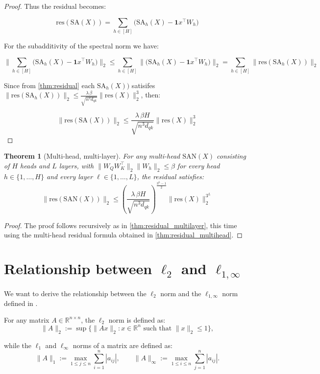 \documentclass{article}
\theoremstyle{definition}
\theoremstyle{plain}
\newtheorem{theorem}{Theorem}
\begin{document}
\begin{appendices}
\begin{proof}
Thus the residual becomes:

\[
\mathrm{res}(\mathrm{SA}(X)) = \sum_{h \in [H]} \bigl(\mathrm{SA}_h(X) - \mathbf{1}x^\top W_h\bigr)
\]

For the subadditivity of the spectral norm we have:

\[\|\sum_{h \in [H]} \bigl(\mathrm{SA}_h(X) - \mathbf{1}x^\top W_h\bigr)\|_2 \le  \sum_{h \in [H]} \|\bigl(\mathrm{SA}_h(X) - \mathbf{1}x^\top W_h\bigr)\|_2 = \sum_{h \in [H]} \|\mathrm{res}(\mathrm{SA}_h(X))\|_2\]

Since from \cref{thm:residual} each $\mathrm{SA}_h(X))$ satisifes $\|\mathrm{res}(\mathrm{SA}{_h}(X))\|_2\le\frac{\lambda\,\beta}{\sqrt{n^{3}d_{qk}}}\|\mathrm{res}(X)\|_2^3$, then:

\[\|\mathrm{res}(\mathrm{SA}(X))\|_2 \le \frac{\lambda\,\beta H}{\sqrt{n^{3}d_{qk}}}\|\mathrm{res}(X)\|_2^3\]
\end{proof}

\begin{theorem}[Multi-head, multi-layer]
For any multi-head $\mathrm{SAN}(X)$ consisting of $H$ heads and $L$ layers, with $\|W_Q W_K^\top\|_2\|W_h\|_2 \le \beta$ for every head $h \in \{1,\dots,H\}$ and every layer $\ell \in \{1,\dots,L\}$, the residual satisfies:
\[
\boxed{
\|\mathrm{res}(\mathrm{SAN}(X))\|_2
\le
\left(
\frac{\lambda\, \beta H}{\sqrt{n^{3}d_{qk}}}
\right)^{\frac{3^L-1}{2}}
\|\mathrm{res}(X)\|_2^{3^L}
}
\]

\end{theorem}

\begin{proof}
The proof follows recursively as in \cref{thm:residual_multilayer}, this time using the multi-head residual formula obtained in \cref{thm:residual_multihead}.
\end{proof}

\section{Relationship between $\ell_2$ and $\ell_{1,\infty}$}\label{apx:rel_norm}

We want to derive the relationship between the $\ell_2$ norm and the $\ell_{1,\infty}$ norm defined in \cite{dong2021attention}.

For any matrix \( A \in \mathbb{R}^{n \times n} \), the $\ell_2$ norm is defined as:
\[
\|A\|_2 := \sup \{\|Ax\|_{2} : x \in \mathbb{R}^{n} \text{ such that } \|x\|_{2} \le 1\},
\]

while the $\ell_1$ and $\ell_\infty$ norms of a matrix are defined as:
\[
\|A\|_1 := \max_{1 \le j \le n} \sum_{i=1}^{n} |a_{ij}|, 
\qquad
\|A\|_\infty := \max_{1 \le i \le n} \sum_{j=1}^{n} |a_{ij}|.
\]


\end{appendices}
\end{document}
